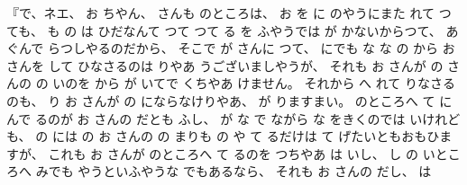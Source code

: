 『で、ネエ、
%
お
ちやん、
%
さんも
のところは、
%
お
を
に
のやうにまた
れて
つても、
%
も
の
は
ひだなんて
つて
つて
る
を
ふやうでは
が
かないからつて、
%
あぐんで
らつしやるのだから、
%
そこで
が
さんに
つて、
%
にでも
な
な
の
から
お
さんを
して
ひなさるのは
りやあ
うございましやうが、
%
それも
お
さんが
の
さんの
の
いのを
から
が
いてで
くちやあ
けません。
%
それから
へ
れて
りなさるのも、
%
り
お
さんが
の
にならなけりやあ、
%
が%
りますまい。
%
のところへ
て
に
んで
るのが
お
さんの
だとも
ふし、
%
が
な
で
ながら
な
をきくのでは
いけれども、
%
の
には
の
お
さんの
の
まりも
の
や
て
るだけは
て
げたいともおもひますが、
%
これも
お
さんが
のところへ
て
るのを
つちやあ
は
いし、
%
し
の
いところへ
みでも
やうといふやうな
でもあるなら、
%
それも
お
さんの
だし、
%
は
